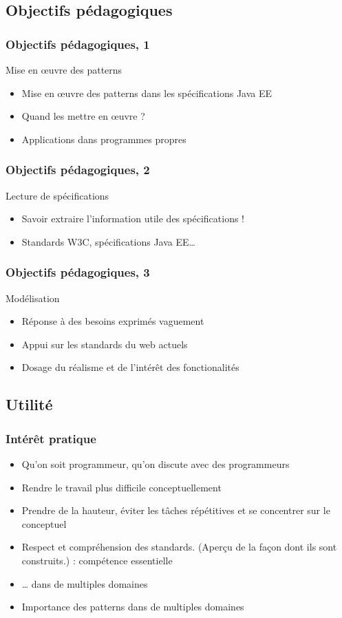 \documentclass[english, french]{beamer}
\begin{document}
\subsection{Objectifs pédagogiques}
\begin{frame}
	\frametitle{Objectifs pédagogiques, 1}
	\begin{block}{Mise en œuvre des patterns}
		\begin{itemize}
		\item Mise en œuvre des patterns dans les spécifications Java EE
		\item Quand les mettre en œuvre ?
		\item Applications dans programmes propres
		\end{itemize}
	\end{block}
\end{frame}

\begin{frame}
	\frametitle{Objectifs pédagogiques, 2}
	\begin{block}{Lecture de spécifications}
		\begin{itemize}
		\item Savoir extraire l’information utile des spécifications !
		\item Standards W3C, spécifications Java EE…
		\end{itemize}
	\end{block}
\end{frame}

\begin{frame}
	\frametitle{Objectifs pédagogiques, 3}
	\begin{block}{Modélisation}
		\begin{itemize}
		\item Réponse à des besoins exprimés vaguement
		\item Appui sur les standards du web actuels
		\item Dosage du réalisme et de l’intérêt des fonctionalités
		\end{itemize}
	\end{block}
\end{frame}

\subsection{Utilité}
\begin{frame}
	\frametitle{Intérêt pratique}
	\begin{itemize}
		\item Qu’on soit programmeur, qu’on discute avec des programmeurs
		\item Rendre le travail plus difficile conceptuellement
		\item Prendre de la hauteur, éviter les tâches répétitives et se concentrer sur le conceptuel
		\item Respect et compréhension des standards. (Aperçu de la façon dont ils sont construits.) : compétence essentielle
		\item … dans de multiples domaines
		\item Importance des patterns dans de multiples domaines
	\end{itemize}
\end{frame}
\end{document}
